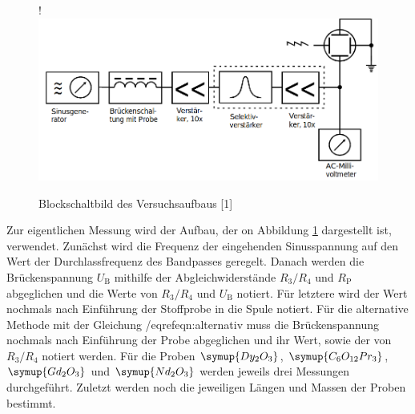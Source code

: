\begin{figure} [H]!
    \centering
    \includegraphics[scale=0.3]{content/bild2.png}
    \caption{Blockschaltbild des Versuchsaufbaus [1]}
    \label{fig:plot2}
  \end{figure}

Zur eigentlichen Messung wird der Aufbau, der on Abbildung \ref{fig:plot2}
dargestellt ist, verwendet. Zunächst wird die Frequenz der eingehenden Sinusspannung
auf den Wert der Durchlassfrequenz des Bandpasses geregelt. Danach werden die
Brückenspannung $U_\text{B}$ mithilfe der Abgleichwiderstände $R_3 / R_4$ und $R_\text{P}$
abgeglichen und die Werte von $R_3 / R_4$ und $U_\text{B}$ notiert. Für letztere wird der
Wert nochmals nach Einführung der Stoffprobe in die Spule notiert.
Für die alternative Methode mit der Gleichung /eqref{eqn:alternativ} 
muss die Brückenspannung nochmals nach Einführung der Probe abgeglichen und ihr Wert,
sowie der von $R_3 / R_4$ notiert werden.
Für die Proben $\symup{Dy_2O_3}$, $\symup{C_6O_{12}Pr_3}$, 
$\symup{Gd_2O_3}$ und $\symup{Nd_2O_3}$ werden jeweils drei Messungen durchgeführt.
Zuletzt werden noch die jeweiligen Längen und Massen der Proben bestimmt.





